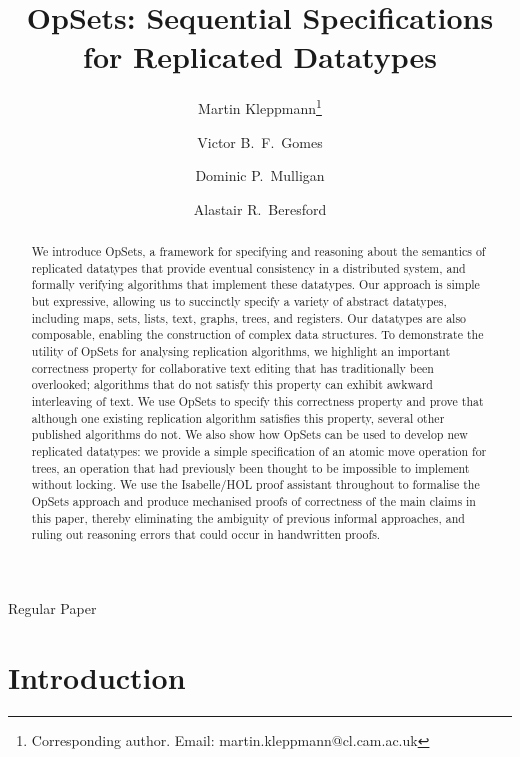 \documentclass[11pt]{article}
\begin{document}
\sloppy
\title{OpSets: Sequential Specifications for Replicated Datatypes}
\author[1]{Martin Kleppmann\thanks{Corresponding author. Email: martin.kleppmann@cl.cam.ac.uk}}
\author[1]{Victor B.\ F.\ Gomes}
\author[2]{Dominic P.\ Mulligan}
\author[1]{Alastair R.\ Beresford}
\date{}


\maketitle

\begin{center}
Regular Paper
\end{center}

\begin{abstract}
We introduce OpSets, a framework for specifying and reasoning about the semantics of replicated datatypes that provide eventual consistency in a distributed system, and formally verifying algorithms that implement these datatypes.
Our approach is simple but expressive, allowing us to succinctly specify a variety of abstract datatypes, including maps, sets, lists, text, graphs, trees, and registers.
Our datatypes are also composable, enabling the construction of complex data structures.
To demonstrate the utility of OpSets for analysing replication algorithms, we highlight an important correctness property for collaborative text editing that has traditionally been overlooked; algorithms that do not satisfy this property can exhibit awkward interleaving of text.
We use OpSets to specify this correctness property and prove that although one existing replication algorithm satisfies this property, several other published algorithms do not.
We also show how OpSets can be used to develop new replicated datatypes: we provide a simple specification of an atomic move operation for trees, an operation that had previously been thought to be impossible to implement without locking.
We use the Isabelle/HOL proof assistant throughout to formalise the OpSets approach and produce mechanised proofs of correctness of the main claims in this paper, thereby eliminating the ambiguity of previous informal approaches, and ruling out reasoning errors that could occur in handwritten proofs.
\end{abstract}
\clearpage

\section{Introduction}
\end{document}
